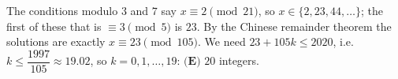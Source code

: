 The conditions modulo $3$ and $7$ say $x\equiv2\pmod{21}$, so $x\in\{2,23,44,\ldots\}$; the first of these that is $\equiv3\pmod5$ is $23$. By the Chinese remainder theorem the solutions are exactly $x\equiv23\pmod{105}$. We need $23+105k\le2020$, i.e. $k\le\dfrac{1997}{105}\approx19.02$, so $k=0,1,\dots,19$: $\boxed{\textbf{(E) }20}$ integers.
